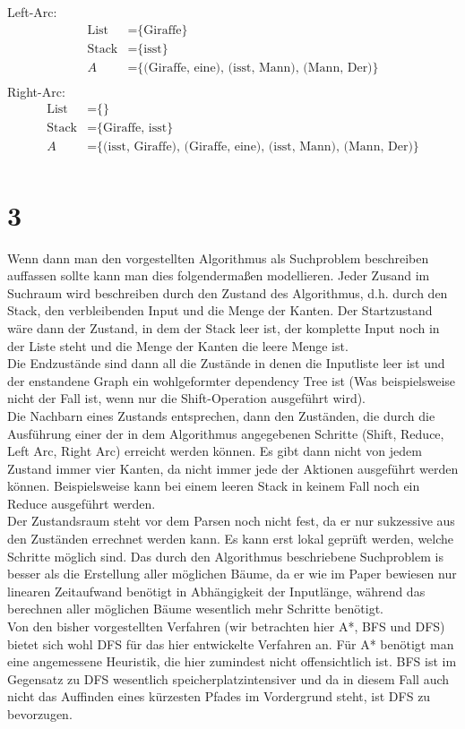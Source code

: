 \documentclass[a4paper,11pt,fleqn]{scrartcl}
\begin{document}
Left-Arc:
\begin{align}
	\text{List} &= \text{\{Giraffe\}} \\ 
	\text{Stack} &= \text{\{isst\}} \\
	A &= \text{\{(Giraffe, eine), (isst, Mann), (Mann, Der)\}} \\	
\end{align}
Right-Arc:
\begin{align}
	\text{List} &= \text{\{\}} \\ 
	\text{Stack} &= \text{\{Giraffe, isst\}} \\
	A &= \text{\{(isst, Giraffe), (Giraffe, eine), (isst, Mann), (Mann, Der)\}} \\	
\end{align}


\section*{3}
Wenn dann man den vorgestellten Algorithmus als Suchproblem beschreiben auffassen sollte kann man dies folgendermaßen modellieren. 
Jeder Zusand im Suchraum wird beschreiben durch den Zustand des Algorithmus, d.h. durch den Stack, den verbleibenden Input und die Menge der Kanten. Der Startzustand wäre dann der Zustand, in dem der Stack leer ist, der komplette Input noch in der Liste steht und die Menge der Kanten die leere Menge ist.\\
Die Endzustände sind dann all die Zustände in denen die Inputliste leer ist und der enstandene Graph ein wohlgeformter dependency Tree ist (Was beispielsweise nicht der Fall ist, wenn nur die Shift-Operation ausgeführt wird).\\
Die Nachbarn eines Zustands entsprechen, dann den Zuständen, die durch die Ausführung einer der in dem Algorithmus angegebenen Schritte (Shift, Reduce, Left Arc, Right Arc) erreicht werden können. Es gibt dann nicht von jedem Zustand immer vier Kanten, da nicht immer jede der Aktionen ausgeführt werden können. Beispielsweise kann bei einem leeren Stack in keinem Fall noch ein Reduce ausgeführt werden.\\
Der Zustandsraum steht vor dem Parsen noch nicht fest, da er nur sukzessive aus den Zuständen errechnet werden kann. Es kann erst lokal geprüft werden, welche Schritte möglich sind.
Das durch den Algorithmus beschriebene Suchproblem is besser als die Erstellung aller möglichen Bäume, da er wie im Paper bewiesen nur linearen Zeitaufwand benötigt in Abhängigkeit der Inputlänge, während das berechnen aller möglichen Bäume wesentlich mehr Schritte benötigt.\\
Von den bisher vorgestellten Verfahren (wir betrachten hier A*, BFS und DFS) bietet sich wohl  DFS für das hier entwickelte Verfahren an. Für A* benötigt man eine angemessene Heuristik, die hier zumindest nicht offensichtlich ist. 
BFS ist im Gegensatz zu DFS wesentlich speicherplatzintensiver und da in diesem Fall auch nicht das Auffinden eines kürzesten Pfades im Vordergrund steht, ist DFS zu bevorzugen.
\end{document}

